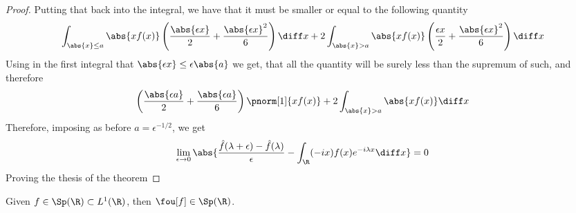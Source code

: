 \documentclass[../mmf.tex]{subfiles}
\begin{document}
\begin{proof}
	Putting that back into the integral, we have that it must be smaller or equal to the following quantity
	\begin{equation*}
		\int_{\abs{x}\le a}^{}\abs{xf(x)}\left( \frac{\abs{\epsilon x}}{2}+\frac{\abs{\epsilon x}^2}{6} \right)\diff x+2\int_{\abs{x}>a}^{}\abs{xf(x)}\left( \frac{\epsilon x}{2}+\frac{\abs{\epsilon x}^2}{6} \right)\diff x
	\end{equation*}
	Using in the first integral that $\abs{\epsilon x}\le\epsilon\abs{a}$ we get, that all the quantity will be surely less than the supremum of such, and therefore
	\begin{equation*}
		\left( \frac{\abs{\epsilon a}}{2}+\frac{\abs{\epsilon a}}{6} \right)\pnorm[1]{xf(x)}+2\int_{\abs{x}>a}^{}\abs{xf(x)}\diff x
	\end{equation*}
	Therefore, imposing as before $a=\epsilon^{-1/2}$, we get
	\begin{equation*}
		\lim_{\epsilon\to0}\abs{\frac{\hat{f}(\lambda+\epsilon)-\hat{f}(\lambda)}{\epsilon}-\int_{\R}^{}(-ix)f(x)e^{-i\lambda x}\diff x}=0
	\end{equation*}
	Proving the thesis of the theorem
\end{proof}
\begin{thm}
	Given $f\in\Sp(\R)\subset L^1(\R)$, then $\fou[f]\in\Sp(\R)$.
\end{thm}
\end{document}
